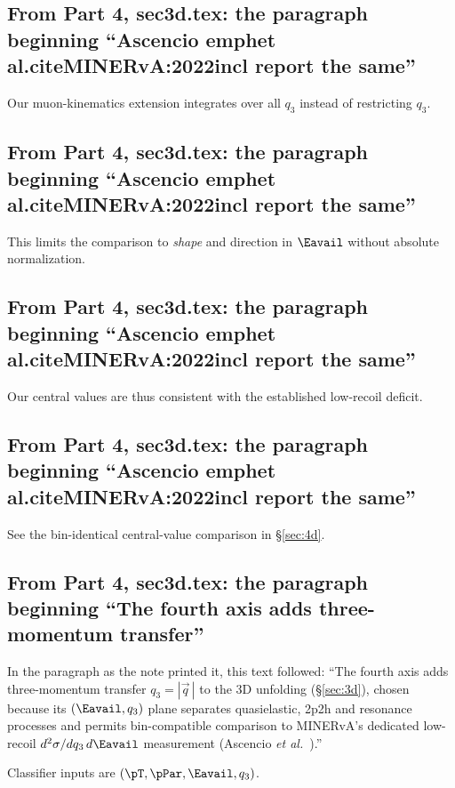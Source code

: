 \subsection{From Part 4, sec3d.tex: the paragraph beginning ``Ascencio emphet al.citeMINERvA:2022incl report the same''}
Our muon-kinematics extension integrates over all $q_3$ instead of restricting $q_3$.

\subsection{From Part 4, sec3d.tex: the paragraph beginning ``Ascencio emphet al.citeMINERvA:2022incl report the same''}
This limits the comparison to \emph{shape} and direction in $\Eavail$ without absolute normalization.

\subsection{From Part 4, sec3d.tex: the paragraph beginning ``Ascencio emphet al.citeMINERvA:2022incl report the same''}
Our central values are thus consistent with the established low-recoil deficit.

\subsection{From Part 4, sec3d.tex: the paragraph beginning ``Ascencio emphet al.citeMINERvA:2022incl report the same''}
See the bin-identical central-value comparison in \S\ref{sec:4d}.

\subsection{From Part 4, sec3d.tex: the paragraph beginning ``The fourth axis adds three-momentum transfer''}
In the paragraph as the note printed it, this text followed: ``The fourth axis adds three-momentum transfer $q_{3}=|\vec{q}\,|$ to the 3D unfolding (\S\ref{sec:3d}), chosen because its $(\Eavail,q_{3})$ plane separates quasielastic, 2p2h and resonance processes and permits bin-compatible comparison to MINERvA's dedicated low-recoil $d^{2}\sigma/dq_{3}\,d\Eavail$ measurement (Ascencio \emph{et al.}~\cite{MINERvA:2022incl}).''\par
Classifier inputs are $(\pT,\pPar,\Eavail,q_{3})$.

